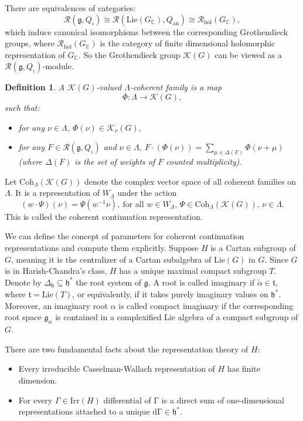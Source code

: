 \documentclass[12pt, a4paper]{amsart}
\numberwithin{equation}{section}
\newtheorem{defn}[thm]{Definition}
\newcommand{\BC}{{\mathbb {C}}}
\newcommand{\CK}{{\mathcal {K}}}
\newcommand{\CR}{{\mathcal {R}}}
\newcommand{\fg}{\mathfrak{g}}
\newcommand{\fh}{\mathfrak{h}}
\newcommand{\ft}{\mathfrak{t}}
\begin{document}
There are equivalences of categories:
\begin{equation}
   \CR(\fg, Q_{\iota}) \cong \CR(\mathrm{Lie}(G_\BC),Q_{\mathrm{an}}) \cong \CR_{\mathrm{hol}}(G_{\BC}),
\end{equation}
which induce canonical isomorphisms between the corresponding Grothendieck groups, where $\CR_{\mathrm{hol}}(G_{\BC})$ is the category of finite dimensional holomorphic representation of $G_{\BC}$. So the Grothendieck group $\CK(G)$ can be viewed as a $\CR(\fg, Q_{\iota})$-module.
\begin{defn}
   A $\CK(G)$-valued $\Lambda$-coherent family is a map
   $$\Phi: \Lambda \to \CK(G),$$
   such that:
   \begin{itemize}
      \item for any $\nu \in \Lambda$, $\Phi(\nu) \in \CK_{\nu}(G)$,
      \item for any $F \in \CR(\fg, Q_{\iota})$ and $\nu \in \Lambda$, $F \cdot (\Phi(\nu)) = \sum_{\mu \in \Delta(F)} \Phi(\nu + \mu)$ (where $\Delta(F)$ is the set of weights of $F$ counted multiplicity).
   \end{itemize}
\end{defn}

Let $\mathrm{Coh}_{\Lambda}(\CK(G))$ denote the complex vector space of all coherent families on $\Lambda$. It is a representation of $W_{\Lambda}$ under the action
$$(w \cdot \Psi)(\nu) = \Psi(w^{-1}\nu), \ \textrm{for all $w \in W_{\Lambda}$, $\Psi \in \mathrm{Coh}_{\Lambda}(\CK(G))$, $\nu \in \Lambda$.}$$
This is called the coherent continuation representation.

We can define the concept of parameters for coherent continuation representations and compute them explicitly.
Suppose $H$ is a Cartan subgroup of $G$, meaning it is the centralizer of a Cartan subalgebra of $\mathrm{Lie}(G)$ in $G$. Since $G$ is in Harish-Chandra's class, $H$ has a unique maximal compact subgroup $T$. Denote by $\Delta_{\fh} \subseteq \fh^*$ the root system of $\fg$. A root is called imaginary if $\check{\alpha} \in \ft$, where $\ft = \mathrm{Lie}(T)$, or equivalently, if it takes purely imaginary values on $\fh^*$. Moreover, an imaginary root $\alpha$ is called compact imaginary if the corresponding root space $\fg_{\alpha}$ is contained in a complexified Lie algebra of a compact subgroup of $G$.

There are two fundamental facts about the representation theory of $H$:
\begin{itemize}
    \item Every irreducible Casselman-Wallach representation of $H$ has finite  dimension.
    \item For every $\Gamma \in \mathrm{Irr}(H)$ differential of $\mathrm{\Gamma}$ is a direct sum of one-dimensional representations attached to a unique $\mathrm{d\Gamma} \in \fh^*$.
\end{itemize}
\end{document}
